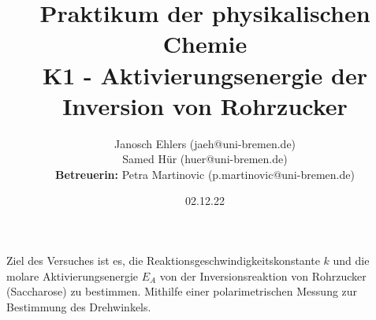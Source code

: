 \documentclass[a4paper, 11pt]{article}
\title{Praktikum der physikalischen Chemie\\\large K1 - Aktivierungsenergie der Inversion von Rohrzucker}
\author{Janosch Ehlers (jaeh@uni-bremen.de)\\Samed Hür (huer@uni-bremen.de)\\\textbf{Betreuerin:} Petra Martinovic (p.martinovic@uni-bremen.de)}
\date{02.12.22}
\begin{document}
\maketitle
\thispagestyle{empty}
\newpage

\thispagestyle{empty}
\tableofcontents
\newpage
{}

Ziel des Versuches ist es, die Reaktionsgeschwindigkeitskonstante $k$ und die molare Aktivierungsenergie $E_A$ von der Inversionsreaktion von Rohrzucker (Saccharose) zu bestimmen. 
Mithilfe einer polarimetrischen Messung zur Bestimmung des Drehwinkels. 




\newpage

\newpage


\nocite{skript}

\printbibliography
\end{document}

